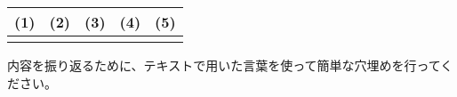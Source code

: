 \documentclass[uplatex,dvipdfmx,a4paper,11pt]{jsarticle}
\begin{document}
\vspace{-5mm}
\begin{table}[tb]
  \begin{center} 
    \begin{tabular}{|p{}|p{}|p{}|p{}|p{}|} \hline
      (1) & (2) & (3) & (4) & (5)\\ \hline \hline
        &  & & &  \\ \hline		
    \end{tabular}
  \end{center}
\end{table}

\clearpage
{}
内容を振り返るために、テキストで用いた言葉を使って簡単な穴埋めを行ってください。
\end{document}
